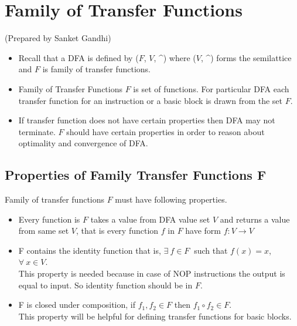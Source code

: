 \section {Family of Transfer Functions}
\setlength{\parindent}{0pt}
(Prepared by Sanket Gandhi)

\vspace{0.3cm}
\begin{itemize}
    \item Recall that a DFA is defined by ($F$, $V$, \^{}) where ($V$, \^{}) forms the semilattice and $F$ is family of transfer functions.
    \item Family of Transfer Functions $F$ is set of functions. For particular DFA each transfer function for an instruction or a basic block is drawn from the set $F$. 
    \item If transfer function does not have certain properties then DFA may not terminate. $F$ should have certain properties in order to reason about optimality and convergence of DFA.
\end{itemize}

\subsection{Properties of Family Transfer Functions F}
Family of transfer functions $F$ must have following properties.  
\begin{itemize}
    \item Every function is $F$ takes a value from DFA value set $V$ and returns a value from same set $V$, that is every function $f$ in $F$ have form $f:V \rightarrow V $
    \item F contains the identity function that is, $\exists \ f \in F \ $ such that $f(x) = x $, $ \forall \ x \in V$. \\ This property is needed because in case of NOP instructions the output is equal to input. So identity function should be in $F$.  
    \item F is closed under composition, if $f_{1},f_{2} \in F$ then $f_{1}\circ f_{2} \in F$.\\ This property will be helpful for defining transfer functions for basic blocks.
\end{itemize}

